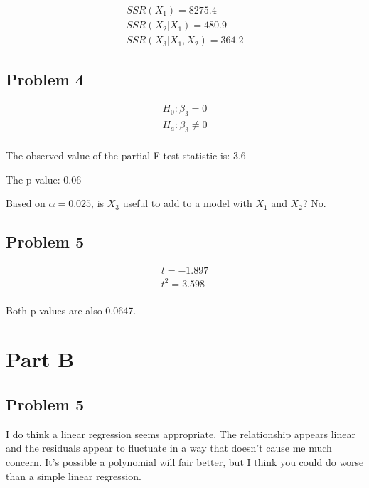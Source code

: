 \documentclass[
  letterpaper,
  DIV=11,
  numbers=noendperiod]{scrartcl}
\begin{document}
\[
\begin{aligned}
SSR(X_1) = 8275.4 \\
SSR(X_2 | X_1) = 480.9 \\
SSR(X_3|X_1, X_2) = 364.2
\end{aligned}
\]

\hypertarget{problem-4}{%
\subsection{Problem 4}\label{problem-4}}

\[
\begin{aligned}
H_0: \beta_3 = 0 \\
H_a: \beta_3 \neq 0 \\
\end{aligned}
\]

The observed value of the partial F test statistic is: 3.6

The p-value: 0.06

Based on \(\alpha = 0.025\), is \(X_3\) useful to add to a model with
\(X_1\) and \(X_2\)? No.

\hypertarget{problem-5}{%
\subsection{Problem 5}\label{problem-5}}

\[
\begin{aligned}
t = -1.897 \\
t^2 = 3.598 \\
\end{aligned}
\]

Both p-values are also 0.0647.

\hypertarget{part-b}{%
\section{Part B}\label{part-b}}

\hypertarget{problem-5-1}{%
\subsection{Problem 5}\label{problem-5-1}}

I do think a linear regression seems appropriate. The relationship
appears linear and the residuals appear to fluctuate in a way that
doesn't cause me much concern. It's possible a polynomial will fair
better, but I think you could do worse than a simple linear regression.
\end{document}

